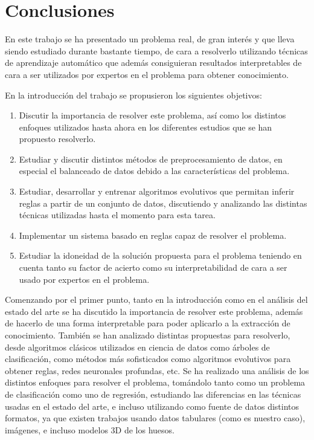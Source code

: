 \section{Conclusiones}

En este trabajo se ha presentado un problema real, de gran interés y que lleva siendo estudiado durante bastante tiempo, de cara a resolverlo utilizando técnicas de aprendizaje automático que además consiguieran resultados interpretables de cara a ser utilizados por expertos en el problema para obtener conocimiento.

En la introducción del trabajo se propusieron los siguientes objetivos:

\begin{enumerate}
	\item Discutir la importancia de resolver este problema, así como los distintos enfoques utilizados hasta ahora en los diferentes estudios que se han propuesto resolverlo.
	\item Estudiar y discutir distintos métodos de preprocesamiento de datos, en especial el balanceado de datos debido a las características del problema.
	\item Estudiar, desarrollar y entrenar algoritmos evolutivos que permitan inferir reglas a partir de un conjunto de datos, discutiendo y analizando las distintas técnicas utilizadas hasta el momento para esta tarea.
	\item Implementar un sistema basado en reglas capaz de resolver el problema.
	\item Estudiar la idoneidad de la solución propuesta para el problema teniendo en cuenta tanto su factor de acierto como su interpretabilidad de cara a ser usado por expertos en el problema.
\end{enumerate}

Comenzando por el primer punto, tanto en la introducción como en el análisis del estado del arte se ha discutido la importancia de resolver este problema, además de hacerlo de una forma interpretable para poder aplicarlo a la extracción de conocimiento. También se han analizado distintas propuestas para resolverlo, desde algoritmos clásicos utilizados en ciencia de datos como árboles de clasificación, como métodos más sofisticados como algoritmos evolutivos para obtener reglas, redes neuronales profundas, etc. Se ha realizado una análisis de los distintos enfoques para resolver el problema, tomándolo tanto como un problema de clasificación como uno de regresión, estudiando las diferencias en las técnicas usadas en el estado del arte, e incluso utilizando como fuente de datos distintos formatos, ya que existen trabajos usando datos tabulares (como es nuestro caso), imágenes, e incluso modelos 3D de los huesos.


